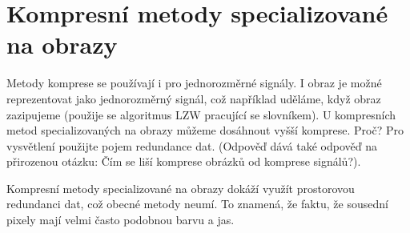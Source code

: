 \section{Kompresní metody specializované na obrazy}
Metody komprese se používají i pro jednorozměrné signály. I obraz je možné reprezentovat jako jednorozměrný 
signál, což například uděláme, když obraz zazipujeme (použije se algoritmus LZW pracující se slovníkem). U kompresních 
metod specializovaných na obrazy můžeme dosáhnout vyšší komprese. Proč? Pro vysvětlení použijte pojem redundance dat. 
(Odpověď dává také odpověď na přirozenou otázku: Čím se liší komprese obrázků od komprese signálů?).

Kompresní metody specializované na obrazy dokáží využít prostorovou redundanci dat, což obecné metody neumí. To znamená,
že faktu, že sousední pixely mají velmi často podobnou barvu a jas.